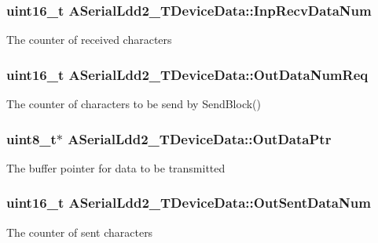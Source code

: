 \subsubsection[{\texorpdfstring{Inp\+Recv\+Data\+Num}{InpRecvDataNum}}]{\setlength{\rightskip}{0pt plus 5cm}uint16\+\_\+t A\+Serial\+Ldd2\+\_\+\+T\+Device\+Data\+::\+Inp\+Recv\+Data\+Num}\hypertarget{struct_a_serial_ldd2___t_device_data_a551da007a82d4fd4e26ea72007112f46}{}\label{struct_a_serial_ldd2___t_device_data_a551da007a82d4fd4e26ea72007112f46}
The counter of received characters 
\subsubsection[{\texorpdfstring{Out\+Data\+Num\+Req}{OutDataNumReq}}]{\setlength{\rightskip}{0pt plus 5cm}uint16\+\_\+t A\+Serial\+Ldd2\+\_\+\+T\+Device\+Data\+::\+Out\+Data\+Num\+Req}\hypertarget{struct_a_serial_ldd2___t_device_data_ac460a80b8506535c36fa730e3a61283d}{}\label{struct_a_serial_ldd2___t_device_data_ac460a80b8506535c36fa730e3a61283d}
The counter of characters to be send by Send\+Block() 
\subsubsection[{\texorpdfstring{Out\+Data\+Ptr}{OutDataPtr}}]{\setlength{\rightskip}{0pt plus 5cm}uint8\+\_\+t$\ast$ A\+Serial\+Ldd2\+\_\+\+T\+Device\+Data\+::\+Out\+Data\+Ptr}\hypertarget{struct_a_serial_ldd2___t_device_data_ab4427d30f2614d2947ac957aa5eb9165}{}\label{struct_a_serial_ldd2___t_device_data_ab4427d30f2614d2947ac957aa5eb9165}
The buffer pointer for data to be transmitted 
\subsubsection[{\texorpdfstring{Out\+Sent\+Data\+Num}{OutSentDataNum}}]{\setlength{\rightskip}{0pt plus 5cm}uint16\+\_\+t A\+Serial\+Ldd2\+\_\+\+T\+Device\+Data\+::\+Out\+Sent\+Data\+Num}\hypertarget{struct_a_serial_ldd2___t_device_data_a80df4c32d72ab149e6dbfb99b41c14f2}{}\label{struct_a_serial_ldd2___t_device_data_a80df4c32d72ab149e6dbfb99b41c14f2}
The counter of sent characters 
